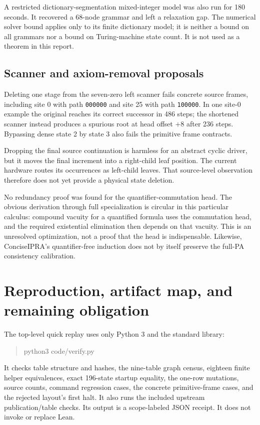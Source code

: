 \documentclass[11pt,a4paper]{article}
\newcommand{\code}[1]{\texttt{#1}}
\begin{document}
A restricted dictionary-segmentation mixed-integer model was also run
for 180 seconds. It recovered a 68-node grammar and left a relaxation
gap. The numerical solver bound applies only to its finite dictionary
model; it is neither a bound on all grammars nor a bound on Turing-machine
state count. It is not used as a theorem in this report.

\subsection{Scanner and axiom-removal proposals}

Deleting one stage from the seven-zero left scanner fails concrete source
frames, including site 0 with path \code{000000} and site 25 with path
\code{100000}. In one site-0 example the original reaches its correct
successor in 486 steps; the shortened scanner instead produces a spurious
root at head offset $+8$ after 236 steps. Bypassing dense state 2 by state
3 also fails the primitive frame contracts.

Dropping the final source continuation is harmless for an abstract cyclic
driver, but it moves the final increment into a right-child leaf position.
The current hardware routes its occurrences as left-child leaves. That
source-level observation therefore does not yet provide a physical state
deletion.

No redundancy proof was found for the quantifier-commutation head.
The obvious derivation through full specialization is circular in this
particular calculus: compound vacuity for a quantified formula uses the
commutation head, and the required existential elimination then depends
on that vacuity. This is an unresolved optimization, not a proof that the
head is indispensable. Likewise, ConciseIPRA's quantifier-free induction
does not by itself preserve the full-PA consistency calibration.

\section{Reproduction, artifact map, and remaining obligation}

The top-level quick replay uses only Python 3 and the standard library:
\begin{quote}\ttfamily
python3 code/verify.py
\end{quote}
It checks table structure and hashes, the nine-table graph census,
eighteen finite helper equivalences, exact 196-state startup equality,
the one-row mutations, source counts, command regression cases, the
concrete primitive-frame cases, and the rejected layout's first halt.
It also runs the included upstream publication/table checks. Its output
is a scope-labeled JSON receipt. It does not invoke or replace Lean.
\end{document}
